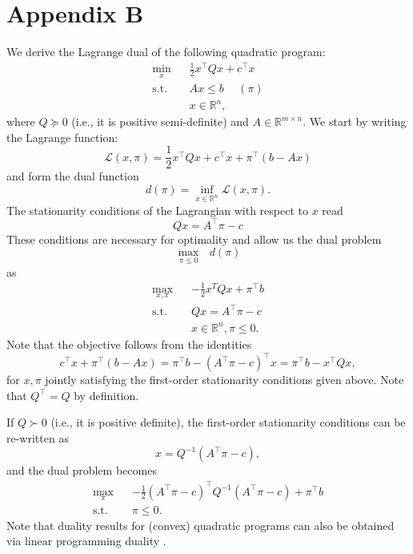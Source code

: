 \documentclass{article}
\begin{document}
\section*{Appendix B}
We derive the Lagrange dual of the following quadratic program:
\begin{align*}
\underset{x}{\min} \hspace{10pt} & \frac{1}{2}x^\top Q x + c^\top x\\
\mbox{s.t. } & Ax \le b \hspace{15pt} (\pi)\\
&x \in \mathbb{R}^n,
\end{align*}
where $Q \succeq 0$ (i.e., it is positive semi-definite) and $A \in \mathbb{R}^{m \times n}$. We start by writing the Lagrange function:
\begin{equation*}
\mathcal{L}(x, \pi) = \frac{1}{2}x^\top Q x + c^\top x + \pi^\top(b - Ax)
\end{equation*}
and form the dual function
\begin{equation*}
d(\pi) = \underset{x \in \mathbb{R}^n}{\inf} \mathcal{L}(x, \pi).
\end{equation*}
The stationarity conditions of the Lagrangian with respect to $x$ read
\begin{equation*}
Qx = A^\top \pi -c
\end{equation*}
These conditions are necessary for optimality and allow us the dual problem
\begin{equation*}
\underset{\pi \le 0}{\max} \mbox{ }d(\pi)
\end{equation*}
as
\begin{align*}
\underset{x, \pi}{\max} \hspace{10pt} & -\frac{1}{2}x^T Q x + \pi^\top b\\
\mbox{s.t. } & Qx = A^\top \pi -c\\
&x \in \mathbb{R}^n, \pi \le 0.
\end{align*}
Note that the objective follows from the identities
\begin{equation*}
c^\top x + \pi^\top(b - Ax) = \pi^\top b - (A^\top \pi - c)^\top x =  \pi^\top b - x^\top Q x,
\end{equation*}
for $x, \pi$ jointly satisfying the first-order stationarity conditions given above. Note that $Q^\top = Q$ by definition. 

If $Q \succ 0$ (i.e., it is positive definite), the first-order stationarity conditions can be re-written as
\begin{equation*}
x = Q^{-1}(A^\top \pi - c),
\end{equation*}
and the dual problem becomes
\begin{align*}
\underset{\pi}{\max} \hspace{10pt} & -\frac{1}{2}(A^\top \pi -c)^\top Q^{-1} (A^\top \pi -c) + \pi^\top b\\
\mbox{s.t. } & \pi \le 0.
\end{align*}
Note that duality results for (convex) quadratic programs can also be obtained via linear programming duality \cite{Dorn1960}.
\end{document}
